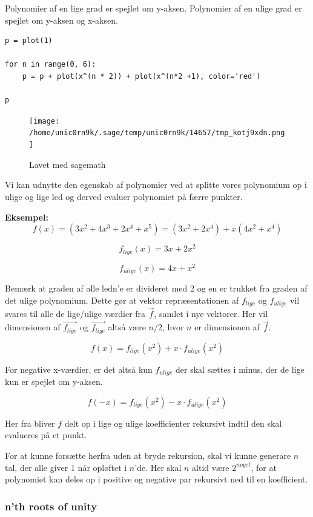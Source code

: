 \documentclass[11pt,a4paper]{article}
\begin{document}
\newpage

Polynomier af en lige grad er spejlet om y-aksen.
Polynomier af en ulige grad er spejlet om y-aksen og x-aksen.

\begin{verbatim}
p = plot(1)

for n in range(0, 6):
    p = p + plot(x^(n * 2)) + plot(x^(n*2 +1), color='red')

p
\end{verbatim}

\begin{figure}[htbp]
\centering
\texttt{[image: /home/unic0rn9k/.sage/temp/unic0rn9k/14657/tmp\_kotj9xdn.png]}
\caption{Lavet med sagemath}
\end{figure}

Vi kan udnytte den egenskab af polynomier ved at splitte vores polynomium op i ulige og lige led
og derved evaluer polynomiet på færre punkter.

\bigskip

\textbf{Eksempel:}
$$
f(x) = (3x^2 + 4x^3 + 2x^4 + x^5) = (3x^2 + 2x^4) + x(4x^2 + x^4)
$$

$$
f_{lige}(x) = 3x + 2x^2
$$

$$
f_{ulige}(x) = 4x + x^2
$$

Bemærk at graden af alle ledn'e er divideret med 2 og en er trukket fra graden af det ulige polynomium.
Dette gør at vektor repræsentationen af \(f_{lige}\) og \(f_{ulige}\) vil svares til alle de lige/ulige værdier fra \(\vec{f}\),
samlet i nye vektorer. Her vil dimensionen af \({\vec{f_{lige}}}\) og \({\vec{f_{lige}}}\) altså være \(n/2\), hvor \(n\) er dimensionen af \(\vec{f}\).

$$
f(x) = f_{lige}(x^2) + x \cdot f_{ulige}(x^2)
$$

For negative x-værdier, er det altså kun \(f_{ulige}\) der skal sættes i minus,
der de lige kun er spejlet om y-aksen.

$$
f(-x) = f_{lige}(x^2) - x \cdot f_{ulige}(x^2)
$$

Her fra bliver \(f\) delt op i lige og ulige koefficienter rekursivt indtil den skal evalueres på et punkt.

For at kunne forsætte herfra uden at bryde rekursion, skal vi kunne generare \(n\) tal, der alle giver 1 når opløftet i \(n\)'de.
Her skal \(n\) altid være \(2^{noget}\), for at polynomiet kan deles op i positive og negative par rekursivt ned til en koefficient.

\bigskip

\subsubsection{n'th roots of unity}
\label{sec:org5eb2748}
\end{document}

